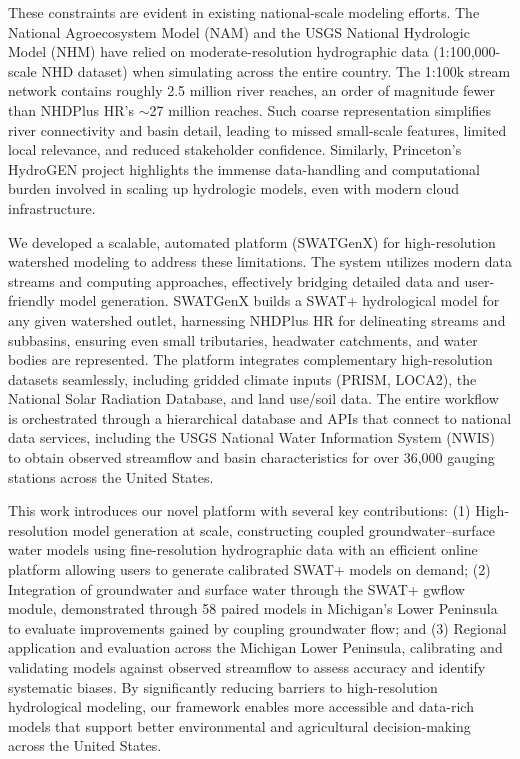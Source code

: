 \documentclass[final,3p,times]{elsarticle}
\begin{document}
These constraints are evident in existing national-scale modeling efforts. The National Agroecosystem Model (NAM) and the USGS National Hydrologic Model (NHM) have relied on moderate-resolution hydrographic data (1:100,000-scale NHD dataset) when simulating across the entire country. The 1:100k stream network contains roughly 2.5 million river reaches, an order of magnitude fewer than NHDPlus HR's $\sim$27 million reaches. Such coarse representation simplifies river connectivity and basin detail, leading to missed small-scale features, limited local relevance, and reduced stakeholder confidence. Similarly, Princeton's HydroGEN project highlights the immense data-handling and computational burden involved in scaling up hydrologic models, even with modern cloud infrastructure.

We developed a scalable, automated platform (SWATGenX) for high-resolution watershed modeling to address these limitations. The system utilizes modern data streams and computing approaches, effectively bridging detailed data and user-friendly model generation. SWATGenX builds a SWAT+ hydrological model for any given watershed outlet, harnessing NHDPlus HR for delineating streams and subbasins, ensuring even small tributaries, headwater catchments, and water bodies are represented. The platform integrates complementary high-resolution datasets seamlessly, including gridded climate inputs (PRISM, LOCA2), the National Solar Radiation Database, and land use/soil data. The entire workflow is orchestrated through a hierarchical database and APIs that connect to national data services, including the USGS National Water Information System (NWIS) to obtain observed streamflow and basin characteristics for over 36,000 gauging stations across the United States.

This work introduces our novel platform with several key contributions: (1) High-resolution model generation at scale, constructing coupled groundwater--surface water models using fine-resolution hydrographic data with an efficient online platform allowing users to generate calibrated SWAT+ models on demand; (2) Integration of groundwater and surface water through the SWAT+ gwflow module, demonstrated through 58 paired models in Michigan's Lower Peninsula to evaluate improvements gained by coupling groundwater flow; and (3) Regional application and evaluation across the Michigan Lower Peninsula, calibrating and validating models against observed streamflow to assess accuracy and identify systematic biases. By significantly reducing barriers to high-resolution hydrological modeling, our framework enables more accessible and data-rich models that support better environmental and agricultural decision-making across the United States.
\end{document}
